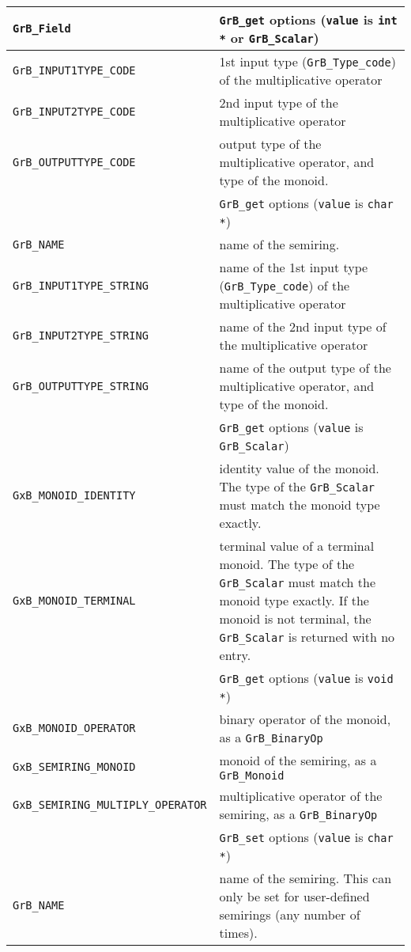 \noindent
{\small
\begin{tabular}{p{2.25in}p{3.5in}}
\hline
\hline
\verb'GrB_Field'                    & \verb'GrB_get' options (\verb'value' is \verb'int *' or \verb'GrB_Scalar') \\
\hline
\verb'GrB_INPUT1TYPE_CODE'          & 1st input type (\verb'GrB_Type_code') of the multiplicative operator \\
\verb'GrB_INPUT2TYPE_CODE'          & 2nd input type of the multiplicative operator\\
\verb'GrB_OUTPUTTYPE_CODE'          & output type of the multiplicative operator, and type of the monoid. \\
\hline
\hline
                                    & \verb'GrB_get' options (\verb'value' is \verb'char *') \\
\hline
\verb'GrB_NAME'                     & name of the semiring. \\
\verb'GrB_INPUT1TYPE_STRING'        & name of the 1st input type (\verb'GrB_Type_code')
                                        of the multiplicative operator \\
\verb'GrB_INPUT2TYPE_STRING'        & name of the 2nd input type of the multiplicative operator\\
\verb'GrB_OUTPUTTYPE_STRING'        & name of the output type of the multiplicative operator,
                                        and type of the monoid. \\
\hline
\hline
                                    & \verb'GrB_get' options (\verb'value' is \verb'GrB_Scalar') \\
\hline
\verb'GxB_MONOID_IDENTITY'          & identity value of the monoid.  The type of the \verb'GrB_Scalar'
                                        must match  the monoid type exactly. \\
\verb'GxB_MONOID_TERMINAL'          & terminal value of a terminal monoid.  The type of the \verb'GrB_Scalar'
                                        must match  the monoid type exactly.  If the monoid is not terminal,
                                        the \verb'GrB_Scalar' is returned with no entry. \\
\hline
\hline
                                    & \verb'GrB_get' options (\verb'value' is \verb'void *') \\
\hline
\verb'GxB_MONOID_OPERATOR'          & binary operator of the monoid, as a \verb'GrB_BinaryOp' \\
\verb'GxB_SEMIRING_MONOID'          & monoid of the semiring, as a \verb'GrB_Monoid' \\
\verb'GxB_SEMIRING_MULTIPLY_OPERATOR' & multiplicative operator of the semiring, as a \verb'GrB_BinaryOp' \\
\hline
\hline
                                    & \verb'GrB_set' options (\verb'value' is \verb'char *') \\
\hline
\verb'GrB_NAME'                     & name of the semiring.
                                        This can only be set for user-defined semirings
                                        (any number of times). \\
\hline
\end{tabular}
}

